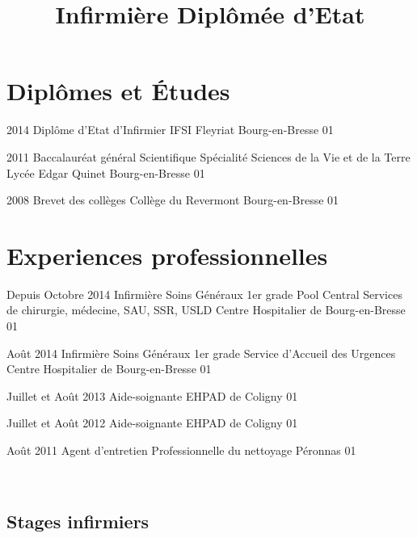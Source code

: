 \documentclass[10pt,a4paper]{moderncv}
\title{Infirmière Diplômée d'Etat}
\begin{document}
\maketitle
\pagestyle{empty}


\section{Diplômes et Études}

\cventry
	{2014}
	{Diplôme d'Etat d'Infirmier}
	{IFSI Fleyriat}
	{Bourg-en-Bresse}
	{01}
	{}

\cventry
	{2011}
	{Baccalauréat général Scientifique}
	{Spécialité Sciences de la Vie et de la Terre}
	{Lycée Edgar Quinet}
	{Bourg-en-Bresse}
	{01}

\cventry
	{2008}
	{Brevet des collèges}
	{Collège du Revermont}
	{Bourg-en-Bresse}
	{01}
	{}


\section{Experiences professionnelles}


\cventry
	{Depuis Octobre 2014}
	{Infirmière Soins Généraux 1er grade}
	{Pool Central}
	{Services de chirurgie, médecine, SAU, SSR, USLD}
	{Centre Hospitalier de Bourg-en-Bresse}
	{01}

\cventry
	{Août 2014}
	{Infirmière Soins Généraux 1er grade}
	{Service d'Accueil des Urgences}
	{Centre Hospitalier de Bourg-en-Bresse}
	{01}
	{}


\cventry
	{Juillet et Août 2013}
	{Aide-soignante}
	{EHPAD de Coligny}
	{01}
	{}
	{}

\cventry
    {Juillet et Août 2012}
	{Aide-soignante}
	{EHPAD de Coligny}
	{01}
	{}
	{}

\cventry
	{Août 2011}
	{Agent d'entretien}
	{Professionnelle du nettoyage}
	{Péronnas}
	{01}
	{}

~~\\

\subsection{Stages infirmiers}
\end{document}
